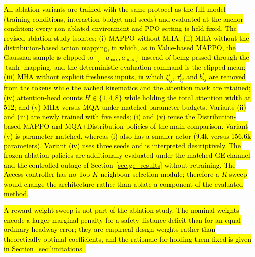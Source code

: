 \documentclass{ieeeaccess}
\begin{document}
\hl{All ablation variants are trained with the same protocol as the full model (training conditions, interaction budget and seeds) and evaluated at the anchor condition; every non-ablated environment and PPO setting is held fixed. The revised ablation study isolates: (i) MAPPO without MHA; (ii) MHA without the distribution-based action mapping, in which, as in Value-based MAPPO, the Gaussian sample is clipped to $[-a_{\max},a_{\max}]$ instead of being passed through the $\tanh$ mapping, and the deterministic evaluation command is the clipped mean; (iii) MHA without explicit freshness inputs, in which $\xi_{ij}^t$, $\tau_{ij}^t$ and $b_{ij}^t$ are removed from the tokens while the cached kinematics and the attention mask are retained; (iv) attention-head counts $H\in\{1,4,8\}$ while holding the total attention width at 512; and (v) MHA versus MQA under matched parameter budgets. Variants (ii) and (iii) are newly trained with five seeds; (i) and (v) reuse the Distribution-based MAPPO and MQA+Distribution policies of the main comparison. Variant (v) is parameter-matched, whereas (i) also has a smaller actor (9.4k versus 156.6k parameters). Variant (iv) uses three seeds and is interpreted descriptively. The frozen ablation policies are additionally evaluated under the matched GE channel and the controlled outage of Section~\ref{sec:ge_results} without retraining. The Access controller has no Top-$K$ neighbour-selection module; therefore a $K$ sweep would change the architecture rather than ablate a component of the evaluated method.} %

\hl{A reward-weight sweep is not part of the ablation study. The nominal weights encode a larger marginal penalty for a safety-distance deficit than for an equal ordinary headway error; they are empirical design weights rather than theoretically optimal coefficients, and the rationale for holding them fixed is given in Section~\ref{sec:limitations}.}
\end{document}
